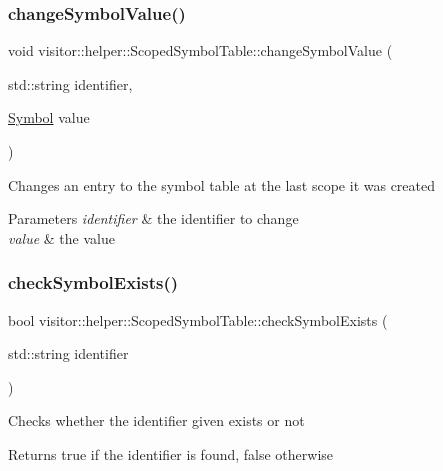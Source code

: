 \subsubsection{\texorpdfstring{change\+Symbol\+Value()}{changeSymbolValue()}}
{\footnotesize\ttfamily void visitor\+::helper\+::\+Scoped\+Symbol\+Table\+::change\+Symbol\+Value (\begin{DoxyParamCaption}\item[{std\+::string}]{identifier,  }\item[{\hyperlink{structvisitor_1_1helper_1_1Symbol}{Symbol}}]{value }\end{DoxyParamCaption})}

Changes an entry to the symbol table at the last scope it was created 
\begin{DoxyParams}{Parameters}
{\em identifier} & the identifier to change \\
\hline
{\em value} & the value \\
\hline
\end{DoxyParams}
\mbox{\label{classvisitor_1_1helper_1_1ScopedSymbolTable_a173eb4fb447dfcc8f8eaedfffeb7ae97}} 
\subsubsection{\texorpdfstring{check\+Symbol\+Exists()}{checkSymbolExists()}}
{\footnotesize\ttfamily bool visitor\+::helper\+::\+Scoped\+Symbol\+Table\+::check\+Symbol\+Exists (\begin{DoxyParamCaption}\item[{std\+::string}]{identifier }\end{DoxyParamCaption})}

Checks whether the identifier given exists or not \begin{DoxyReturn}{Returns}
true if the identifier is found, false otherwise 
\end{DoxyReturn}
\mbox{\label{classvisitor_1_1helper_1_1ScopedSymbolTable_a30038c7ddf4e21666d163d3f41382ff1}} 
